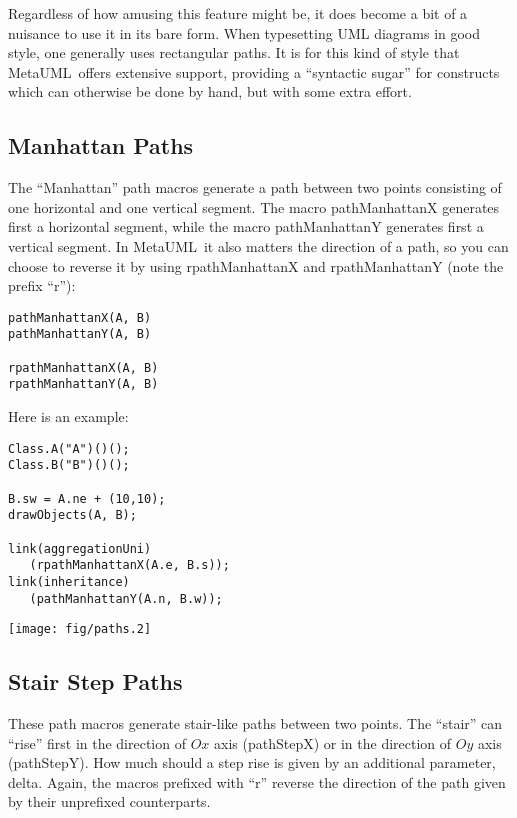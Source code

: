 \documentclass{article}
\newcommand{\code}{\ttfamily}
\newcommand{\metauml}{MetaUML}
\begin{document}
Regardless of how amusing this feature might be, it does become a bit of a nuisance to
use it in its bare form. When typesetting UML diagrams in good style, one generally
uses rectangular paths. It is for this kind of style that \metauml\ offers extensive
support, providing a ``syntactic sugar'' for constructs which can otherwise be
done by hand, but with some extra effort.

\subsection{Manhattan Paths}

The ``Manhattan'' path macros generate a path between two points consisting of one
horizontal and one vertical segment. The macro {\code pathManhattanX} generates first a
horizontal segment, while the macro {\code pathManhattanY} generates first a
vertical segment. In \metauml\ it also matters the direction of a path, so you
can choose to reverse it by using {\code rpathManhattanX} and {\code rpathManhattanY}
(note the prefix ``{\code r}''):

\begin{verbatim}
pathManhattanX(A, B)
pathManhattanY(A, B)

rpathManhattanX(A, B)
rpathManhattanY(A, B)
\end{verbatim}

\pagebreak
Here is an example:

\begin{multicols}{2}
\begin{verbatim}
Class.A("A")()();
Class.B("B")()();

B.sw = A.ne + (10,10);
drawObjects(A, B);

link(aggregationUni)
   (rpathManhattanX(A.e, B.s));
link(inheritance)
   (pathManhattanY(A.n, B.w));
\end{verbatim}
\columnbreak
\hspace{1cm}\texttt{[image: fig/paths.2]}
\end{multicols}

\subsection{Stair Step Paths}

These path macros generate stair-like paths between two points.
The ``stair'' can ``rise'' first in the direction of $Ox$ axis ({\code pathStepX})
or in the direction of $Oy$ axis ({\code pathStepY}). How much should a step
rise is given by an additional parameter, {\code delta}. Again, the macros
prefixed with ``{\code r}'' reverse the direction of the path given by their
unprefixed counterparts.
\end{document}

